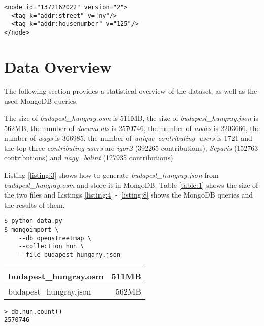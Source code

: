 \documentclass{article}
\begin{document}
\begin{multicols}{2}
\begin{lstlisting}[caption=A non fixable street name issue.,label={listing:2}]
<node id="1372162022" version="2">
  <tag k="addr:street" v="ny"/>
  <tag k="addr:housenumber" v="125"/>
</node>
\end{lstlisting}


\section{Data Overview}

The following section provides a statistical overview of the dataset, as well as the used MongoDB queries.

The size of \textit{budapest\_hungray.osm} is 511MB, the size of \textit{budapest\_hungray.json} is 562MB, the number of \textit{documents} is 2570746, the number of \textit{nodes} is 2203666, the number of \textit{ways} is 366985, the number of \textit{unique\ contributing\ users} is 1721 and the top three \textit{contributing users} are \textit{igor2} (392265 contributions), \textit{Separis} (152763 contributions) and \textit{nagy\_balint} (127935 contributions).

Listing \ref{listing:3} shows how to generate \textit{budapest\_hungray.json} from \textit{budapest\_hungray.osm} and store it in MongoDB, Table  \ref{table:1} shows the size of the two files and Listings \ref{listing:4} - \ref{listing:8} shows the MongoDB queries and the results of them.

\begin{lstlisting}[caption="Generate \textit{budapest\_hungray.json} from \textit{budapest\_hungray.osm} and import it into MongoDB.",label={listing:3}]
$ python data.py
$ mongoimport \
    --db openstreetmap \
    --collection hun \
    --file budapest_hungary.json
\end{lstlisting}

\label{table:1}
\begin{tabular}{lr}
\hline
budapest\_hungray.osm  & 511MB \\
\hline
budapest\_hungray.json & 562MB \\
\hline
\end{tabular}
\break

\begin{lstlisting}[caption=Number of documents.,label={listing:4}]
> db.hun.count()
2570746
\end{lstlisting}


\end{multicols}
\end{document}
